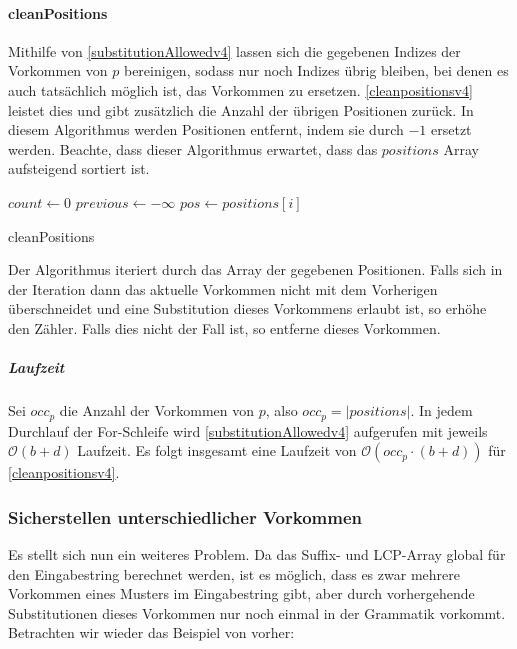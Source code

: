 \paragraph{cleanPositions}
\label{parcleanpositions}

Mithilfe von \autoref{substitutionAllowedv4} lassen sich die gegebenen Indizes der Vorkommen von $p$ bereinigen, sodass nur noch Indizes übrig bleiben, bei denen es auch tatsächlich möglich ist, das Vorkommen zu ersetzen. \autoref{cleanpositionsv4} leistet dies und gibt zusätzlich die Anzahl der übrigen Positionen zurück. In diesem Algorithmus werden Positionen entfernt, indem sie durch $-1$ ersetzt werden. Beachte, dass dieser Algorithmus erwartet, dass das $positions$ Array aufsteigend sortiert ist.

\begin{algorithm}[t]
    $count \leftarrow 0$\;
    $previous \leftarrow -\infty$\;
     {
        $pos \leftarrow positions[i]$\;
    }
    \caption{cleanPositions}
    \label{cleanpositionsv4}
\end{algorithm}

Der Algorithmus iteriert durch das Array der gegebenen Positionen. Falls sich in der Iteration dann das aktuelle Vorkommen nicht mit dem Vorherigen überschneidet und eine Substitution dieses Vorkommens erlaubt ist, so erhöhe den Zähler. Falls dies nicht der Fall ist, so entferne dieses Vorkommen.

\subparagraph{Laufzeit}
Sei $occ_p$ die Anzahl der Vorkommen von $p$, also $occ_p = |positions|$. In jedem Durchlauf der For-Schleife wird \autoref{substitutionAllowedv4} aufgerufen mit jeweils $\mathcal{O}(b + d)$ Laufzeit. Es folgt insgesamt eine Laufzeit von $\mathcal{O}(occ_p \cdot (b + d))$ für \autoref{cleanpositionsv4}.

\subsubsection{Sicherstellen unterschiedlicher Vorkommen}
\label{differingV4}

Es stellt sich nun ein weiteres Problem. Da das Suffix- und LCP-Array global für den Eingabestring berechnet werden, ist es möglich, dass es zwar mehrere Vorkommen eines Musters im Eingabestring gibt, aber durch vorhergehende Substitutionen dieses Vorkommen nur noch einmal in der Grammatik vorkommt. Betrachten wir wieder das Beispiel von vorher:

